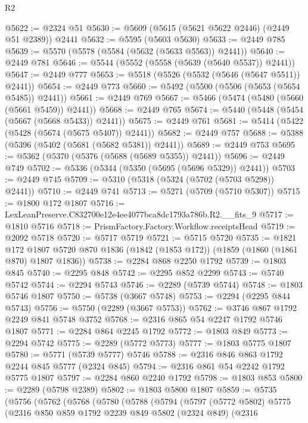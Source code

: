 \begin{lexlean}{R2}
\begin{coremodule}
@5622 := @2324 @51
@5630 := @5609 (@5615 (@5621 @5622 @2446) (@2449 @51 @2389)) @2441
@5632 := @5595 (@5603 @5630)
@5633 := @2449 @785
@5639 := @5570 (@5578 (@5584 (@5632 (@5633 @5563)) @2441))
@5640 := @2449 @781
@5646 := @5544 (@5552 (@5558 (@5639 (@5640 @5537)) @2441))
@5647 := @2449 @777
@5653 := @5518 (@5526 (@5532 (@5646 (@5647 @5511)) @2441))
@5654 := @2449 @773
@5660 := @5492 (@5500 (@5506 (@5653 (@5654 @5485)) @2441))
@5661 := @2449 @769
@5667 := @5466 (@5474 (@5480 (@5660 (@5661 @5459)) @2441))
@5668 := @2449 @765
@5674 := @5440 (@5448 (@5454 (@5667 (@5668 @5433)) @2441))
@5675 := @2449 @761
@5681 := @5414 (@5422 (@5428 (@5674 (@5675 @5407)) @2441))
@5682 := @2449 @757
@5688 := @5388 (@5396 (@5402 (@5681 (@5682 @5381)) @2441))
@5689 := @2449 @753
@5695 := @5362 (@5370 (@5376 (@5688 (@5689 @5355)) @2441))
@5696 := @2449 @749
@5702 := @5336 (@5344 (@5350 (@5695 (@5696 @5329)) @2441))
@5703 := @2449 @745
@5709 := @5310 (@5318 (@5324 (@5702 (@5703 @5298)) @2441))
@5710 := @2449 @741
@5713 := @5271 (@5709 (@5710 @5307))
@5715 := @1800 @172 @1807
@5716 := LexLeanPreserve.C832700e12e4ee4077bca8dc1793a786b.R2.__fits_9
@5717 := @1810 @5716
@5718 := PrismFactory.Factory.Workflow.receiptsHead
@5719 := @2092 @5718
@5720 := @5717 @5719
@5721 := @5715 @5720
@5735 := @1821
    @172
    @1807
    @5720
    @870
    @1836
    (@1842 (@1853 @172))
    (@1859 (@1860 (@1861 @870) @1807 @1836))
@5738 := @2284 @868 @2250 @1792
@5739 := @1803 @845
@5740 := @2295 @848
@5742 := @2295 @852 @2299
@5743 := @5740 @5742
@5744 := @2294 @5743
@5746 := @2289 (@5739 @5744)
@5748 := @1803 @5746 @1807
@5750 := @5738 (@3667 @5748)
@5753 := @2294 (@2295 @844 @5743)
@5756 := @5750 (@2289 (@3667 @5753))
@5762 := @3746 @867 @1792 @2249 @841 @5748 @3752
@5768 := @2316 @865 @54 @2247 @1792 @5746 @1807
@5771 := @2284 @864 @2245 @1792
@5772 := @1803 @849
@5773 := @2294 @5742
@5775 := @2289 (@5772 @5773)
@5777 := @1803 @5775 @1807
@5780 := @5771 (@5739 @5777) @5746
@5788 := @2316 @846 @863 @1792 @2244 @845 @5777 (@2324 @845)
@5794 := @2316 @861 @54 @2242 @1792 @5775 @1807
@5797 := @2284 @860 @2240 @1792
@5798 := @1803 @853
@5800 := @2289 (@5798 @2389)
@5802 := @1803 @5800 @1807
@5859 := @5735
    (@5756
      (@5762
        (@5768
          (@5780
            (@5788
              (@5794
                (@5797
                  (@5772 @5802)
                  @5775
                  (@2316
                    @850
                    @859
                    @1792
                    @2239
                    @849
                    @5802
                    (@2324 @849)
                    (@2316

\end{coremodule}
\end{lexlean}
